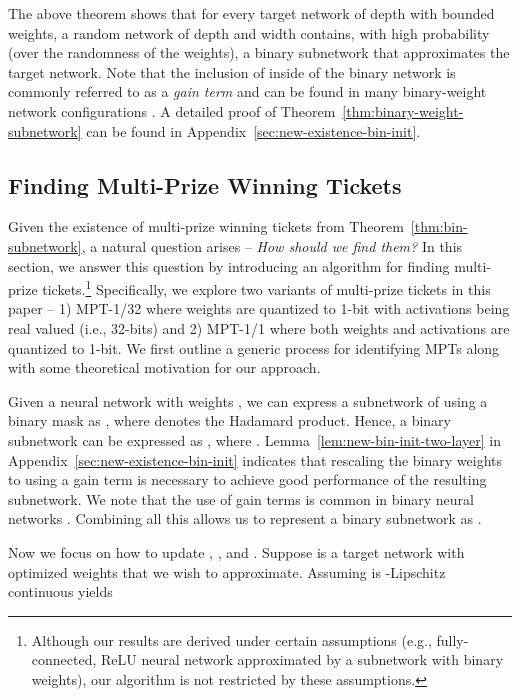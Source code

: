 \documentclass{article} \usepackage{iclr2021_conference,times}
\begin{document}
The above theorem  shows that for every target network of depth  with bounded weights, a random network of depth  and  width  contains, with high probability (over the randomness of the weights), a binary subnetwork that approximates the target network. Note that the inclusion of  inside of the binary network is commonly referred to as a \textit{gain term} and can be found in many binary-weight network configurations \citep{rastegari2016xnornet, lin2017towards, martinez2020training, bulat2019xnor}. A detailed proof of Theorem~\ref{thm:binary-weight-subnetwork} can be found in Appendix~\ref{sec:new-existence-bin-init}.
\fi

\subsection{Finding Multi-Prize Winning Tickets} \label{sec:finding-mpts}
Given the existence of multi-prize winning tickets from Theorem~\ref{thm:bin-subnetwork}, a natural question arises -- \emph{How should we find them?}
In this section, we answer this question by introducing an algorithm for finding multi-prize tickets.\footnote{Although our results are derived under certain assumptions (e.g., fully-connected, ReLU neural network approximated by a subnetwork with binary weights), our algorithm is not restricted by these assumptions.} Specifically, we explore two variants of multi-prize tickets in this paper -- 1) MPT-1/32 where weights are quantized to 1-bit with activations being real valued (i.e., 32-bits) and 2) MPT-1/1 where both weights and activations are quantized to 1-bit. We first outline a generic process for identifying MPTs along with some theoretical motivation for our approach.
 
Given a neural network  with weights , we can express a subnetwork of  using a binary mask  as , where  denotes the Hadamard product. Hence, a binary subnetwork can be expressed as  , where . Lemma~\ref{lem:new-bin-init-two-layer} in Appendix~\ref{sec:new-existence-bin-init} indicates that rescaling the binary weights to  using a gain term   is necessary to achieve good performance of the resulting subnetwork. We note that the use of gain terms is common in binary neural networks \citep{qin2020binary,martinez2020training, bulat2019xnor}. Combining all this allows us to represent a binary subnetwork as . 

Now we focus on how to update , , and . Suppose  is a target network with optimized weights  that we wish to approximate. Assuming  is -Lipschitz continuous yields
\small
\end{document}
